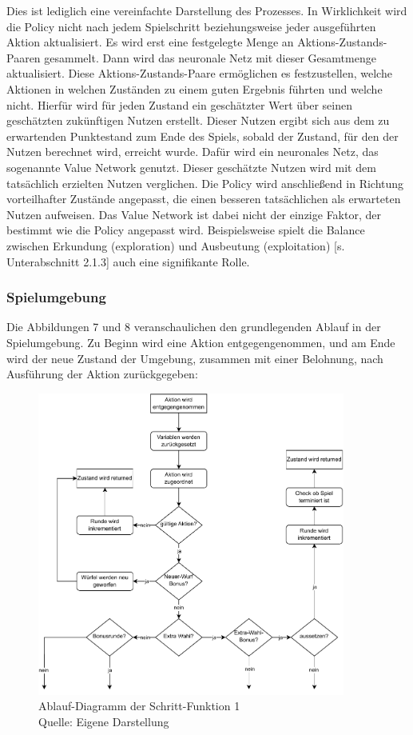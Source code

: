 Dies ist lediglich eine vereinfachte Darstellung des Prozesses. In Wirklichkeit wird die Policy nicht nach jedem Spielschritt beziehungsweise jeder ausgeführten Aktion aktualisiert. Es wird erst eine festgelegte Menge an Aktions-Zustands-Paaren gesammelt. Dann wird das neuronale Netz mit dieser Gesamtmenge aktualisiert. Diese Aktions-Zustands-Paare ermöglichen es festzustellen, welche Aktionen in welchen Zuständen zu einem guten Ergebnis führten und welche nicht. Hierfür wird für jeden Zustand ein geschätzter Wert über seinen geschätzten zukünftigen Nutzen erstellt. Dieser Nutzen ergibt sich aus dem zu erwartenden Punktestand zum Ende des Spiels, sobald der Zustand, für den der Nutzen berechnet wird, erreicht wurde. Dafür wird ein neuronales Netz, das sogenannte Value Network genutzt. Dieser geschätzte Nutzen wird mit dem tatsächlich erzielten Nutzen verglichen. Die Policy wird anschließend in Richtung vorteilhafter Zustände angepasst, die einen besseren tatsächlichen als erwarteten Nutzen aufweisen. Das Value Network ist dabei nicht der einzige Faktor, der bestimmt wie die Policy angepasst wird. Beispielsweise spielt die Balance zwischen Erkundung (exploration) und Ausbeutung (exploitation) [s. Unterabschnitt 2.1.3] auch eine signifikante Rolle.
\subsubsection{Spielumgebung}
Die Abbildungen 7 und 8 veranschaulichen den grundlegenden Ablauf in der Spielumgebung. Zu Beginn wird eine Aktion entgegengenommen, und am Ende wird der neue Zustand der Umgebung, zusammen mit einer Belohnung, nach Ausführung der Aktion zurückgegeben:
\nopagebreak
\begin{figure}[H]
	\centering
	\includegraphics[width=0.9\textwidth]{Bilder/stepf1.drawio (1)} 
	\caption[Ablauf-Diagramm der Schritt-Funktion 1]{Ablauf-Diagramm der Schritt-Funktion 1\\ Quelle: Eigene Darstellung}
\end{figure}	

